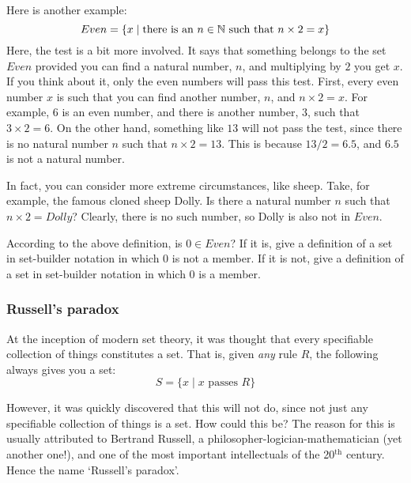 Here is another example: 
\[
Even=\{x\mid \text{there is an }n \in \mathbb{N}\text{ such that }n \times 2=x\}
\]
Here, the test is a bit more involved. It says that something belongs to the set $Even$ provided you can find a natural number, $n$, and multiplying by $2$ you get $x$. If you think about it, only the even numbers will pass this test. First, every even number $x$ is such that you can find another number, $n$, and $n\times 2=x$. For example, $6$ is an even number, and there is another number, $3$, such that $3 \times 2=6$. On the other hand, something like $13$ will not pass the test, since there is no natural number $n$ such that $n\times 2=13$. This is because $13/2=6.5$, and $6.5$ is not a natural number. 


In fact, you can consider more extreme circumstances, like sheep. Take, for example, the famous cloned sheep Dolly. Is there a natural number $n$ such that $n \times 2=Dolly$? Clearly, there is no such number, so Dolly is also not in $Even$. 

\begin{exc}
	According to the above definition, is $0 \in Even$? If it is, give a definition of a set in set-builder notation in which $0$ is not a member. If it is not, give a definition of a set in set-builder notation in which $0$ is a member. 
\end{exc} 

\subsubsection{Russell's paradox}

At the inception of modern set theory, it was thought that every specifiable collection of things constitutes a set. That is, given \textit{any} rule $R$, the following always gives you a set:
\[
S=\{x \mid x \text{ passes }R\}
\]

However, it was quickly discovered that this will not do, since not just any specifiable collection of things is a set. How could this be? The reason for this is usually attributed to Bertrand Russell, a philosopher-logician-mathematician (yet another one!), and one of the most important intellectuals of the 20$^\text{th}$ century. Hence the name `Russell's paradox'.

